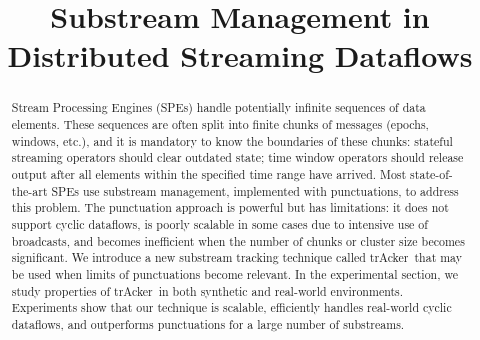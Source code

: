 \documentclass[sigconf]{acmart}
\newcommand {\tracker} {trAcker}
\begin{document}
\title {Substream Management in Distributed Streaming Dataflows}



\begin{abstract}
Stream Processing Engines (SPEs) handle potentially infinite sequences of data elements. These sequences are often split into finite chunks of messages (epochs, windows, etc.), and it is mandatory to know the boundaries of these chunks: stateful streaming operators should clear outdated state; time window operators should release output after all elements within the specified time range have arrived. Most state-of-the-art SPEs use substream management, implemented with punctuations, to address this problem. The punctuation approach is powerful but has limitations: it does not support cyclic dataflows, is poorly scalable in some cases due to intensive use of broadcasts, and becomes inefficient when the number of chunks or cluster size becomes significant. We introduce a new substream tracking technique called \tracker\ that may be used when limits of punctuations become relevant. In the experimental section, we study properties of \tracker\ in both synthetic and real-world environments. Experiments show that our technique is scalable, efficiently handles real-world cyclic dataflows, and outperforms punctuations for a large number of substreams.
\end{abstract}
\end{document}
